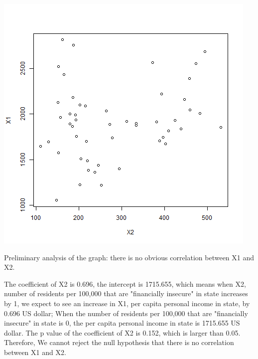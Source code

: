 \documentclass[12pt,letterpaper]{article}
\begin{document}
\begin{itemize}
\includegraphics[scale=.80]{X1 ~ X2.png}

Preliminary analysis of the graph: there is no obvious correlation between X1 and X2.

The coefficient of X2 is 0.696, the intercept is 1715.655, which means when X2, number of residents per 100,000 that are "financially insecure" in state increases by 1, we expect to see an increase in X1, per capita personal income in state, by 0.696 US dollar; When the number of residents per 100,000 that are "financially insecure" in state is 0, the per capita personal income in state is 1715.655 US dollar.
The p value of the coefficient of X2 is 0.152, which is larger than 0.05. Therefore, We cannot reject the null hypothesis that there is no correlation between X1 and X2.



 


\end{itemize}
\end{document}

